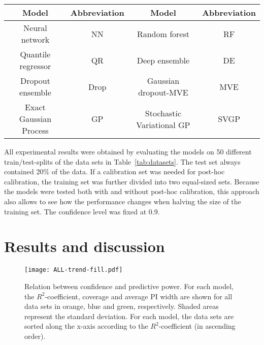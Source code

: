 \documentclass[smallcondensed]{svjour3}
\begin{document}
    \begin{table}[ht!]
        \centering
        \renewcommand{\arraystretch}{1.5}
        \begin{tabular}{|c|c||c|c|}
            \hline
            Model&Abbreviation&Model&Abbreviation\\
            \hline
            Neural network&NN&Random forest&RF\\
            Quantile regressor&QR&Deep ensemble&DE\\
            Dropout ensemble&Drop&Gaussian dropout-MVE&MVE\\
            Exact Gaussian Process&GP&Stochastic Variational GP&SVGP\\
            \hline
        \end{tabular}
    \end{table}
    All experimental results were obtained by evaluating the models on 50 different train/test-splits of the data sets in Table~\ref{tab:datasets}. The test set always contained 20\% of the data. If a calibration set was needed for post-hoc calibration, the training set was further divided into two equal-sized sets. Because the models were tested both with and without post-hoc calibration, this approach also allows to see how the performance changes when halving the size of the training set. The confidence level was fixed at $0.9$.

\section{Results and discussion}\label{section:results}

    \begin{figure}[p]
        \centering
        \texttt{[image: ALL-trend-fill.pdf]}
        \caption{Relation between confidence and predictive power. For each model, the $R^2$-coefficient, coverage and average PI width are shown for all data sets in orange, blue and green, respectively. Shaded areas represent the standard deviation. For each model, the data sets are sorted along the x-axis according to the $R^2$-coefficient (in ascending order).}
        \label{fig:r2_comparison}
    \end{figure}
\end{document}

